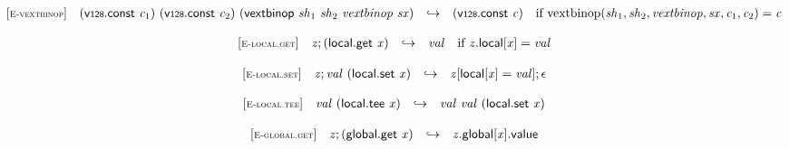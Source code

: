 \vspace{1ex}

$$
\begin{array}{@{}l@{}lcl@{}l@{}}
{[\textsc{\scriptsize E{-}vextbinop}]} \quad & (\mathsf{v{\scriptstyle128}}.\mathsf{const}~{\mathit{c}}_{{1}})~(\mathsf{v{\scriptstyle128}}.\mathsf{const}~{\mathit{c}}_{{2}})~(\mathsf{vextbinop}~{\mathit{sh}}_{{1}}~{\mathit{sh}}_{{2}}~{\mathit{vextbinop}}~{\mathit{sx}}) &\hookrightarrow& (\mathsf{v{\scriptstyle128}}.\mathsf{const}~{\mathit{c}}) &\quad
  \mbox{if}~{\mathrm{vextbinop}}({\mathit{sh}}_{{1}}, {\mathit{sh}}_{{2}}, {\mathit{vextbinop}}, {\mathit{sx}}, {\mathit{c}}_{{1}}, {\mathit{c}}_{{2}}) = {\mathit{c}} \\
\end{array}
$$

\vspace{1ex}

$$
\begin{array}{@{}l@{}lcl@{}l@{}}
{[\textsc{\scriptsize E{-}local.get}]} \quad & {\mathit{z}} ; (\mathsf{local.get}~{\mathit{x}}) &\hookrightarrow& {\mathit{val}} &\quad
  \mbox{if}~{{\mathit{z}}.\mathsf{local}}{[{\mathit{x}}]} = {\mathit{val}} \\
\end{array}
$$

$$
\begin{array}{@{}l@{}lcl@{}l@{}}
{[\textsc{\scriptsize E{-}local.set}]} \quad & {\mathit{z}} ; {\mathit{val}}~(\mathsf{local.set}~{\mathit{x}}) &\hookrightarrow& {\mathit{z}}[\mathsf{local}[{\mathit{x}}] = {\mathit{val}}] ; \epsilon &  \\
\end{array}
$$

$$
\begin{array}{@{}l@{}lcl@{}l@{}}
{[\textsc{\scriptsize E{-}local.tee}]} \quad & {\mathit{val}}~(\mathsf{local.tee}~{\mathit{x}}) &\hookrightarrow& {\mathit{val}}~{\mathit{val}}~(\mathsf{local.set}~{\mathit{x}}) &  \\
\end{array}
$$

\vspace{1ex}

$$
\begin{array}{@{}l@{}lcl@{}l@{}}
{[\textsc{\scriptsize E{-}global.get}]} \quad & {\mathit{z}} ; (\mathsf{global.get}~{\mathit{x}}) &\hookrightarrow& {{\mathit{z}}.\mathsf{global}}{[{\mathit{x}}]}.\mathsf{value} &  \\
\end{array}
$$


